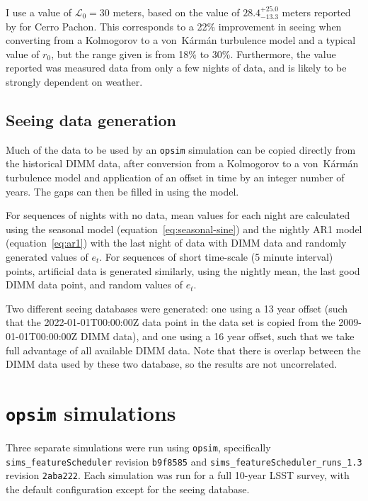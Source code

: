 \documentclass[DM,authoryear,toc]{lsstdoc}
\begin{document}
I use a value of $\mathcal{L}_0 = 30$ meters, based on the
value of $28.4^{+25.0}_{-13.3}$ meters reported by
\cite{2000ApOpt..39.5415Z} for Cerro Pachon. This corresponds to a 22\%
improvement in seeing when converting from a Kolmogorov to a
von~K\'arm\'an turbulence model and a typical value of $r_0$, but the
range given is from 18\% to 30\%. Furthermore, the value reported was
measured data from only a few nights of data, and is likely to be
strongly dependent on weather.

\subsection{Seeing data generation}
\label{sec:data-generation}

Much of the data to be used by an \texttt{opsim} simulation can be copied
directly from the historical DIMM data, after conversion from a
Kolmogorov to a von~K\'arm\'an turbulence model and application of an
offset in time by an integer number of years. The gaps can then be
filled in using the model.

For sequences of nights with no data, mean values for each night are
calculated using the seasonal model (equation~\ref{eq:seasonal-sine})
and the nightly AR1 model (equation~\ref{eq:ar1}) with the last night
of data with DIMM data and randomly generated values of $e_t$. For
sequences of short time-scale (5 minute interval) points, artificial
data is generated similarly, using the nightly mean, the last good
DIMM data point, and random values of $e_t$.

Two different seeing databases were generated: one using a 13 year
offset (such that the 2022-01-01T00:00:00Z data point in the data set
is copied from the 2009-01-01T00:00:00Z DIMM data), and one using a 16
year offset, such that we take full advantage of all available DIMM
data. Note that there is overlap between the DIMM data used by these
two database, so the results are not uncorrelated.

\section{\texttt{opsim} simulations}
\label{sec:simulations}

Three separate simulations were run using \texttt{opsim}, specifically
\texttt{sims\_featureScheduler} revision \texttt{b9f8585} and
\texttt{sims\_featureScheduler\_runs\_1.3} revision
\texttt{2aba222}. Each simulation was run for a full 10-year LSST
survey, with the default configuration except for the seeing database.
\end{document}
